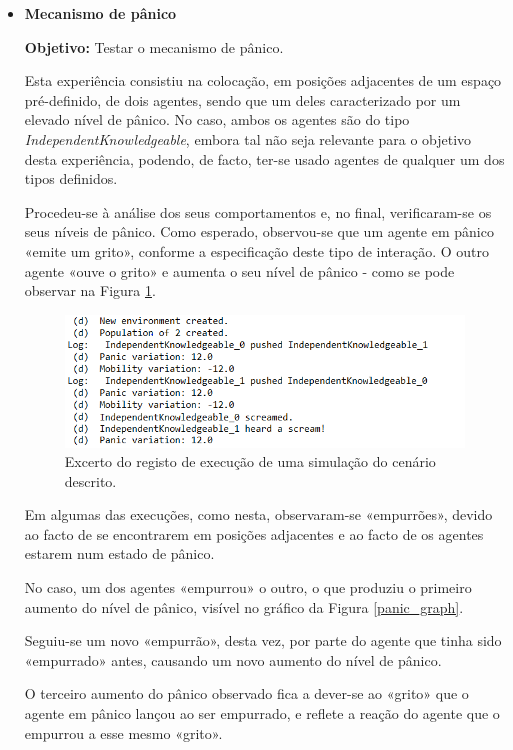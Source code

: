 \documentclass[12pt]{article}
\begin{document}
\begin{titlepage}
\begin{itemize}
	
	\item \textbf{Mecanismo de pânico}
	
	\textbf{Objetivo:} 
	Testar o mecanismo de pânico.
	
	Esta experiência consistiu na colocação, em posições adjacentes de um espaço pré-definido, de dois agentes, sendo que um deles caracterizado por um elevado nível de pânico. No caso, ambos os agentes são do tipo \textit{IndependentKnowledgeable}, embora tal não seja relevante para o objetivo desta experiência, podendo, de facto, ter-se usado agentes de qualquer um dos tipos definidos.
	
	Procedeu-se à análise dos seus comportamentos e, no final, verificaram-se os seus níveis de pânico. 
		Como esperado, observou-se que um agente em pânico «emite um grito», conforme a especificação deste tipo de interação. O outro agente «ouve o grito» e aumenta o seu nível de pânico - como se pode observar na Figura \ref{panic_log}.
	
	\begin{figure}[H]
		\centering
		\includegraphics{panic_log.png}
		\caption{Excerto do registo de execução de uma simulação do cenário descrito.}
		\label{panic_log}
	\end{figure}

	Em algumas das execuções, como nesta, observaram-se «empurrões», devido ao facto de se encontrarem em posições adjacentes e ao facto de os agentes estarem num estado de pânico. 
	
	No caso, um dos agentes «empurrou» o outro, o que produziu o primeiro aumento do nível de pânico, visível no gráfico da Figura \ref{panic_graph}. 
	
	Seguiu-se um novo «empurrão», desta vez, por parte do agente que tinha sido «empurrado» antes, causando um novo aumento do nível de pânico. 
	
	O terceiro aumento do pânico observado fica a dever-se ao «grito» que o agente em pânico lançou ao ser empurrado, e reflete a reação do agente que o empurrou a esse mesmo «grito». 
	

\end{itemize}
\end{titlepage}
\end{document}
